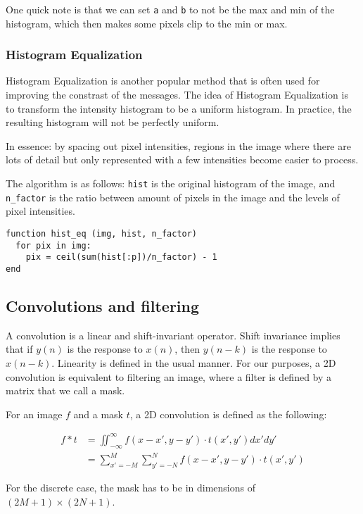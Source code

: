 \documentclass{article}
\begin{document}
\begin{multicols}{2}
One quick note is that we can set \texttt{a} and \texttt{b} to not be the max and min of the histogram, which then makes some pixels clip to the min or max.

\subsubsection{Histogram Equalization}

Histogram Equalization is another popular method that is often used for improving the constrast of the messages. The idea of Histogram Equalization is to transform the intensity histogram to be a uniform histogram. In practice, the resulting histogram will not be perfectly uniform. 

In essence: by spacing out pixel intensities, regions in the image where there are lots of detail but only represented with a few intensities become easier to process.

The algorithm is as follows: \texttt{hist} is the original histogram of the image, and \texttt{n\_factor} is the ratio between amount of pixels in the image and the levels of pixel intensities.

\begin{verbatim}
function hist_eq (img, hist, n_factor)
  for pix in img:
    pix = ceil(sum(hist[:p])/n_factor) - 1
end
\end{verbatim}

\subsection{Convolutions and filtering} 

A convolution is a linear and shift-invariant operator. Shift invariance implies that if $y(n)$ is the response to $x(n)$, then $y(n-k)$ is the response to $x(n-k)$. Linearity is defined in the usual manner. For our purposes, a 2D convolution is equivalent to filtering an image, where a filter is defined by a matrix that we call a mask.

For an image $f$ and a mask $t$, a 2D convolution is defined as the following:

\[
\begin{aligned}
f * t &= \iint_{-\infty}^{\infty} f(x-x', y-y') \cdot t(x',y') dx'dy'\\
      &= \sum_{x' = -M}^{M}\sum_{y' = -N}^{N} f(x-x', y-y') \cdot t(x', y')
\end{aligned}    
\]

For the discrete case, the mask has to be in dimensions of $(2M+1) \times (2N + 1)$.


\end{multicols}
\end{document}
